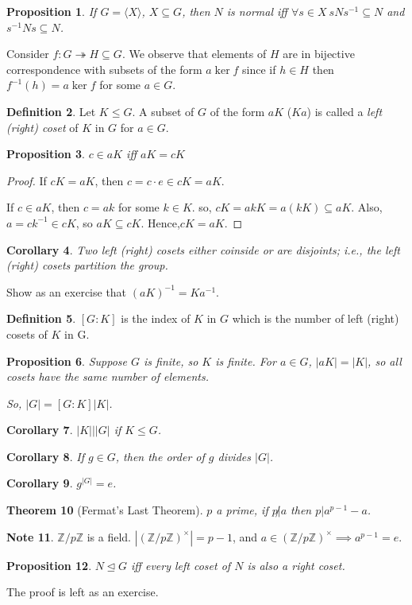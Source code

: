 \documentclass{amsart}
\newtheorem{thm}{Theorem}[section]
\newtheorem{prop}[thm]{Proposition}
\newtheorem{cor}[thm]{Corollary}
\theoremstyle{definition}
\newtheorem{definition}[thm]{Definition}
\newtheorem{note}[thm]{Note}
\newcommand{\Z}{\mathbb Z}
\begin{document}
\begin{prop}
	If $G=\langle X\rangle$, $X\subseteq G$, then $N$ is normal iff $\forall s\in X\ sNs^{-1}\subseteq N$ and $s^{-1}Ns\subseteq N$.
\end{prop}
Consider $f:G\twoheadrightarrow H\subseteq G$. We observe that elements of $H$ are in bijective correspondence with subsets of the form $a\ker f$ since if $h\in H$ then $f^{-1}(h)=a\ker f$ for some $a\in G$.
\begin{definition}
	Let $K\leq G$. A subset of $G$ of the form $aK$ ($Ka$) is called a \emph{left (right) coset} of $K$ in $G$ for $a\in G$.
\end{definition}
\begin{prop}
	$c\in aK$ iff $aK=cK$
\end{prop}
\begin{proof}
	If $cK=aK$, then $c=c\cdot e\in cK=aK$.
	
	If $c\in aK$, then $c=ak$ for some $k\in K$. so, $cK=akK=a(kK)\subseteq aK$. Also, $a=ck^{-1}\in cK$, so $aK\subseteq cK$. Hence,$cK=aK$.
\end{proof}
\begin{cor}
	Two left (right) cosets either coinside or are disjoints; i.e., the left (right) cosets partition the group.
\end{cor}
Show as an exercise that $(aK)^{-1}=Ka^{-1}$.
\begin{definition}
	$[G:K]$ is the index of $K$ in $G$ which is the number of left (right) cosets of $K$ in G.
\end{definition}
\begin{prop}
	Suppose $G$ is finite, so $K$ is finite. For $a\in G$, $|aK|=|K|$, so all cosets have the same number of elements.
	
	So, $|G|=[G:K]|K|$.
\end{prop}
\begin{cor}
	$|K|||G|$ if $K\leq G$.
\end{cor}
\begin{cor}
	If $g\in G$, then the order of $g$ divides $|G|$.
\end{cor}
\begin{cor}
	$g^{|G|}=e$.
\end{cor}
\begin{thm}[Fermat's Last Theorem]
	$p$ a prime, if $p\not| a$ then $p|a^{p-1}-a$.
\end{thm}
\begin{note}
	$\Z/p\Z$ is a field. $|(\Z/p\Z)^\times|=p-1$, and $a\in (\Z/p\Z)^\times\implies a^{p-1}=e$.
\end{note}
\begin{prop}
	$N\unlhd G$ iff every left coset of $N$ is also a right coset.
\end{prop}
The proof is left as an exercise.
\end{document}
